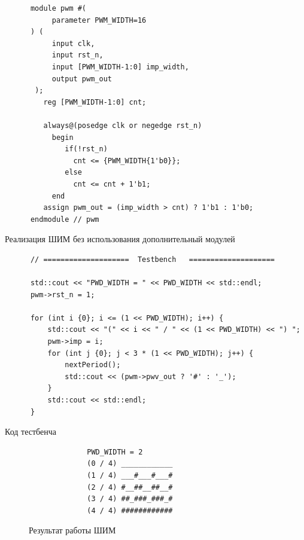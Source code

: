 \documentclass[a4paper]{article}
\begin{document}
  \begin{listing}[H]
    \begin{verbatim}
      module pwm #(
           parameter PWM_WIDTH=16
      ) (
           input clk,
           input rst_n,
           input [PWM_WIDTH-1:0] imp_width,
           output pwm_out
       );
         reg [PWM_WIDTH-1:0] cnt;
         
         always@(posedge clk or negedge rst_n)
           begin
              if(!rst_n)
                cnt <= {PWM_WIDTH{1'b0}};
              else
                cnt <= cnt + 1'b1;
           end
         assign pwm_out = (imp_width > cnt) ? 1'b1 : 1'b0;
      endmodule // pwm
    \end{verbatim}
    \caption{Реализация ШИМ без использования дополнительный модулей}
  \end{listing}

  \begin{listing}[H]
    \begin{verbatim}
      // ====================  Testbench   ====================

      std::cout << "PWD_WIDTH = " << PWD_WIDTH << std::endl;
      pwm->rst_n = 1;

      for (int i {0}; i <= (1 << PWD_WIDTH); i++) {
          std::cout << "(" << i << " / " << (1 << PWD_WIDTH) << ") ";
          pwm->imp = i;
          for (int j {0}; j < 3 * (1 << PWD_WIDTH); j++) {
              nextPeriod();
              std::cout << (pwm->pwv_out ? '#' : '_');
          }
          std::cout << std::endl;
      }
    \end{verbatim}
    \caption{Код тестбенча}
  \end{listing}
  
  \begin{figure}[H]
    \begin{subfigure}[b]{0.75\textwidth}
      \centering
    \end{subfigure}
    \hfill
    \begin{subfigure}[b]{0.2\textwidth}
      \begin{verbatim}
        PWD_WIDTH = 2
        (0 / 4) ____________
        (1 / 4) ___#___#___#
        (2 / 4) #__##__##__#
        (3 / 4) ##_###_###_#
        (4 / 4) ############
      \end{verbatim}
    \end{subfigure}
    \caption{Результат работы ШИМ}
  \end{figure}
\end{document}

